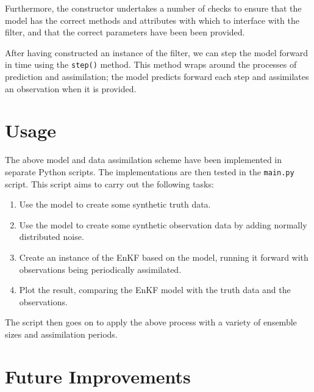 \documentclass[a4paper, 12pt, twoside]{article}
\begin{document}
Furthermore, the constructor undertakes a number of checks to ensure that the
model has the correct methods and attributes with which to interface with the
filter, and that the correct parameters have been been provided.

After having constructed an instance of the filter, we can step the model
forward in time using the \texttt{step()} method.
This method wraps around the processes of prediction and assimilation; the model
predicts forward each step and assimilates an observation when it is provided.

\section{Usage}\label{sec:usage}

The above model and data assimilation scheme have been implemented in separate
Python scripts.
The implementations are then tested in the \texttt{main.py} script.
This script aims to carry out the following tasks:
\begin{enumerate}
    \item Use the model to create some synthetic truth data.
    \item Use the model to create some synthetic observation data by adding
        normally distributed noise.
    \item Create an instance of the EnKF based on the model, running it forward
        with observations being periodically assimilated.
    \item Plot the result, comparing the EnKF model with the truth data and the
        observations.
\end{enumerate}

The script then goes on to apply the above process with a variety of ensemble
sizes and assimilation periods.

\section{Future Improvements}\label{sec:improvements}
\end{document}
